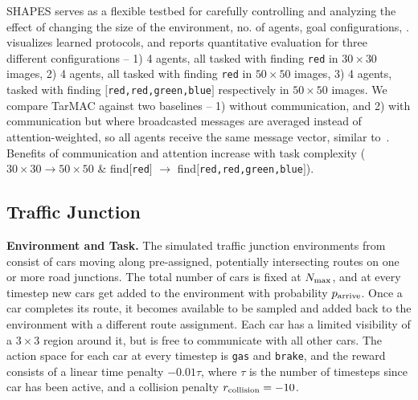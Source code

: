 SHAPES serves as a flexible testbed for carefully controlling and analyzing
the effect of changing the size of the environment, no. of agents, goal configurations, \etc.
 visualizes learned protocols, and 
reports quantitative evaluation for three different configurations --
1) 4 agents, all tasked with finding \texttt{red} in $30 \times 30$ images,
2) 4 agents, all tasked with finding \texttt{red} in $50 \times 50$ images,
3) 4 agents, tasked with finding $[$\texttt{red,red,green,blue}$]$ respectively in $50 \times 50$ images.
We compare TarMAC against two baselines -- 1) without communication, and 2) with communication
but where broadcasted messages are averaged instead of attention-weighted, so
all agents receive the same message vector, similar to~\citet{sukhbaatar_nips16}.
Benefits of communication and attention increase with task complexity
({\scriptsize $30 \times 30 \rightarrow 50 \times 50$ \& find$[$\texttt{red}$]$ $\rightarrow$ find$[$\texttt{red,red,green,blue}$]$}).

\vspace{-5pt}
\subsection{Traffic Junction}
\label{sec:tj}

\textbf{Environment and Task.} The simulated traffic junction environments from~\cite{sukhbaatar_nips16} consist of
cars moving along pre-assigned, potentially intersecting routes on one or more road junctions. The total number of cars is fixed at $N_\textnormal{max}$,
and at every timestep new cars get added to the environment with probability $p_\textnormal{arrive}$. Once a car completes its route, it becomes available to be sampled and added
back to the environment with a different route assignment.
Each car has a limited visibility of a $3 \times 3$ region around it, but is free
to communicate with all other cars. The action space for each car
at every timestep is \texttt{gas} and \texttt{brake}, and the reward consists of a linear time penalty
$-0.01\tau$, where $\tau$ is the number of timesteps since car has been active,
and a collision penalty $r_\textnormal{collision} = -10$.

